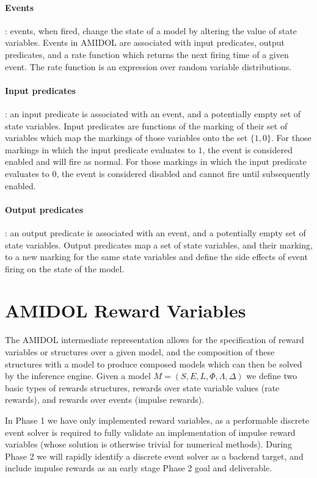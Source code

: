\documentclass[11pt]{article}
\newcommand{\amidol}{\textsc{AMIDOL}}
\begin{document}
\paragraph{Events}: events, when fired, change the state of a model by altering the value of state variables.  Events in \amidol{} are associated with input predicates, output predicates, and a rate function which returns the next firing time of a given event.  The rate function is an expression over random variable distributions.

\paragraph{Input predicates}: an input predicate is associated with an event, and a potentially empty set of state variables.  Input predicates are functions of the marking of their set of variables which map the markings of those variables onto the set $\{1, 0\}$.  For those markings in which the input predicate evaluates to $1$, the event is considered enabled and will fire as normal.  For those markings in which the input predicate evaluates to $0$, the event is considered disabled and cannot fire until subsequently enabled.

\paragraph{Output predicates}: an output predicate is associated with an event, and a potentially empty set of state variables.  Output predicates map a set of state variables, and their marking, to a new marking for the same state variables and define the side effects of event firing on the state of the model.

\section{\amidol{} Reward Variables}

The \amidol{} intermediate representation allows for the specification of reward variables or structures over a given model, and the composition of these structures with a model to produce composed models which can then be solved by the inference engine.  Given a model $M = (S, E, L, \Phi, \Lambda, \Delta)$ we define two basic types of rewards structures, rewards over state variable values (rate rewards), and rewards over events (impulse rewards). \cite{qureshi1996algorithms,deavours1999efficient,ciardo1996well,sanders1991reduced}

In Phase 1 we have only implemented reward variables, as a performable discrete event solver is required to fully validate an implementation of impulse reward variables (whose solution is otherwise trivial for numerical methods).  During Phase 2 we will rapidly identify a discrete event solver as a backend target, and include impulse rewards as an early stage Phase 2 goal and deliverable.
\end{document}
